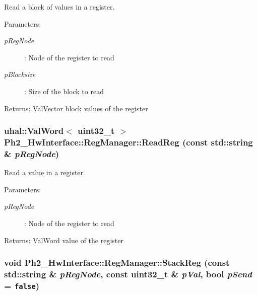 Read a block of values in a register. 

\begin{Desc}
\item[Parameters:]
\begin{description}
\item[{\em p\-Reg\-Node}]: Node of the register to read \item[{\em p\-Blocksize}]: Size of the block to read \end{description}
\end{Desc}
\begin{Desc}
\item[Returns:]Val\-Vector block values of the register \end{Desc}
\hypertarget{class_ph2___hw_interface_1_1_reg_manager_077e0a18592206365150680213345112}{
\subsubsection[ReadReg]{\setlength{\rightskip}{0pt plus 5cm}uhal::Val\-Word$<$ uint32\_\-t $>$ Ph2\_\-Hw\-Interface::Reg\-Manager::Read\-Reg (const std::string \& {\em p\-Reg\-Node})}}
\label{class_ph2___hw_interface_1_1_reg_manager_077e0a18592206365150680213345112}


Read a value in a register. 

\begin{Desc}
\item[Parameters:]
\begin{description}
\item[{\em p\-Reg\-Node}]: Node of the register to read \end{description}
\end{Desc}
\begin{Desc}
\item[Returns:]Val\-Word value of the register \end{Desc}
\hypertarget{class_ph2___hw_interface_1_1_reg_manager_409c95948e25ea5fb7f897926e9de1e6}{
\subsubsection[StackReg]{\setlength{\rightskip}{0pt plus 5cm}void Ph2\_\-Hw\-Interface::Reg\-Manager::Stack\-Reg (const std::string \& {\em p\-Reg\-Node}, const uint32\_\-t \& {\em p\-Val}, bool {\em p\-Send} = {\tt false})}}
\label{class_ph2___hw_interface_1_1_reg_manager_409c95948e25ea5fb7f897926e9de1e6}


